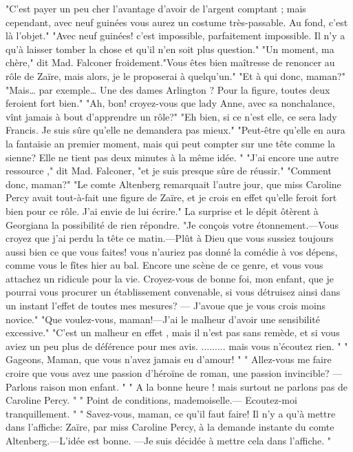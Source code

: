 "C’est payer un peu cher l’avantage d’avoir de l’argent comptant ; mais cependant, avec neuf guinées vous aurez un costume très-passable. Au fond, c’est là l’objet."
"Avec neuf guinées! c’est impossible, parfaitement impossible. Il n’y a qu’à laisser
tomber la chose et qu’il n’en soit plus question."
"Un moment, ma chère," dit Mad. Falconer froidement."Vous êtes bien maîtresse de renoncer au rôle de Zaïre, mais alors, je le proposerai à quelqu’un."
"Et à qui donc, maman?"
"Mais… par exemple… Une des dames Arlington ? Pour la figure, toutes deux feroient fort bien."
"Ah, bon! croyez-vous que lady Anne, avec sa nonchalance, vînt jamais à bout d’apprendre un rôle?"
"Eh bien, si ce n’est elle, ce sera lady Francis. Je suis sûre qu’elle ne demandera pas mieux."
"Peut-être qu’elle en aura la fantaisie an\setcounter{page}{273} premier moment, mais qui peut compter sur une tête comme la sienne? Elle ne tient pas deux minutes à la même idée. "
"J’ai encore une autre ressource ," dit Mad. Falconer, "et je suis presque sûre de réussir."
"Comment donc, maman?"
"Le comte Altenberg remarquait l’autre jour, que miss Caroline Percy avait tout-à-fait une figure de Zaïre, et je crois en effet qu’elle feroit fort bien pour ce rôle. J’ai envie de lui écrire."
La surprise et le dépit ôtèrent à Georgiana la possibilité de rien répondre.
"Je conçois votre étonnement.—Vous croyez que j’ai perdu la tête ce matin.—Plût à Dieu que vous sussiez toujours aussi bien ce que vous faites! vous n’auriez pas donné la comédie à vos dépens, comme vous le fîtes hier au bal. Encore une scène de ce genre, et vous vous attachez un ridicule pour la vie. Croyez-vous de bonne foi, mon enfant, que je pourrai vous procurer un établissement convenable, si vous détruisez ainsi dans un instant l’effet de toutes mes mesures? — J’avoue que je vous crois moins novice."
"Que voulez-vous, maman!—J’ai le malheur d’avoir une sensibilité excessive."
"C’est un malheur en effet , mais il\setcounter{page}{274} n'est pas sans remède, et si vous aviez un peu plus de déférence pour mes avis. ......... mais vous n'écoutez rien. "
" Gageons, Maman, que vous n'avez jamais eu d'amour! "
" Allez-vous me faire croire que vous avez une passion d'héroïne de roman, une passion invincible? —Parlons raison mon enfant. "
" A la bonne heure ! mais surtout ne parlons pas de Caroline Percy. "
" Point de conditions, mademoiselle.— Ecoutez-moi tranquillement. "
" Savez-vous, maman, ce qu'il faut faire! Il n'y a qu'à mettre dans l'affiche: Zaïre, par miss Caroline Percy, à la demande instante du comte Altenberg.—L'idée est bonne. —Je suis décidée à mettre cela dans l'affiche. "

